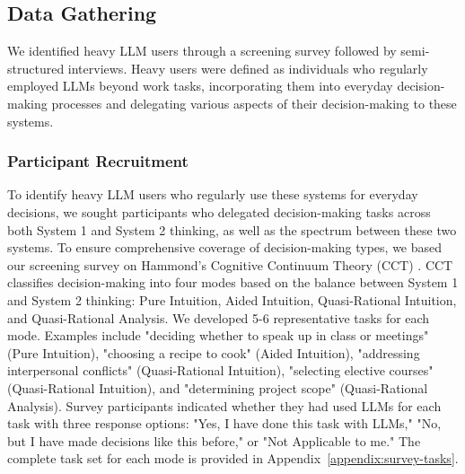 \subsection{Data Gathering}
We identified heavy LLM users through a screening survey followed by semi-structured interviews. Heavy users were defined as individuals who regularly employed LLMs beyond work tasks, incorporating them into everyday decision-making processes and delegating various aspects of their decision-making to these systems.

\subsubsection{Participant Recruitment}
To identify heavy LLM users who regularly use these systems for everyday decisions, we sought participants who delegated decision-making tasks across both System 1 and System 2 thinking, as well as the spectrum between these two systems. To ensure comprehensive coverage of decision-making types, we based our screening survey on Hammond's Cognitive Continuum Theory (CCT) \cite{hammond2000human}. CCT classifies decision-making into four modes based on the balance between System 1 and System 2 thinking: Pure Intuition, Aided Intuition, Quasi-Rational Intuition, and Quasi-Rational Analysis. We developed 5-6 representative tasks for each mode. Examples include "deciding whether to speak up in class or meetings" (Pure Intuition), "choosing a recipe to cook" (Aided Intuition), "addressing interpersonal conflicts" (Quasi-Rational Intuition), "selecting elective courses" (Quasi-Rational Intuition), and "determining project scope" (Quasi-Rational Analysis). Survey participants indicated whether they had used LLMs for each task with three response options: "Yes, I have done this task with LLMs," "No, but I have made decisions like this before," or "Not Applicable to me." The complete task set for each mode is provided in Appendix~\ref{appendix:survey-tasks}.

